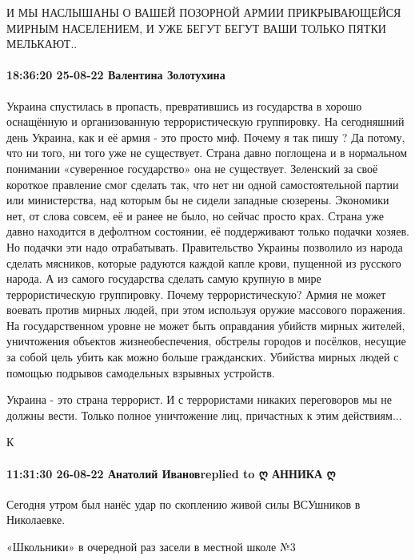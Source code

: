 И МЫ НАСЛЫШАНЫ О ВАШЕЙ ПОЗОРНОЙ АРМИИ ПРИКРЫВАЮЩЕЙСЯ МИРНЫМ НАСЕЛЕНИЕМ, И УЖЕ
БЕГУТ БЕГУТ ВАШИ ТОЛЬКО ПЯТКИ МЕЛЬКАЮТ..


\paragraph{18:36:20 25-08-22 Валентина Золотухина}

Украина спустилась в пропасть, превратившись из государства в хорошо оснащённую
и организованную террористическую группировку. На сегодняшний день Украина, как
и её армия - это просто миф. Почему я так пишу ? Да потому, что ни того, ни
того уже не существует. Страна давно поглощена и в нормальном понимании
«суверенное государство» она не существует. Зеленский за своё короткое
правление смог сделать так, что нет ни одной самостоятельной партии или
министерства, над которым бы не сидели западные сюзерены. Экономики нет, от
слова совсем, её и ранее не было, но сейчас просто крах. Страна уже давно
находится в дефолтном состоянии, её поддерживают только подачки хозяев. Но
подачки эти надо отрабатывать. Правительство Украины позволило из народа
сделать мясников, которые радуются каждой капле крови, пущенной из русского
народа. А из самого государства сделать самую крупную в мире террористическую
группировку. Почему террористическую? Армия не может воевать против мирных
людей, при этом используя оружие массового поражения. На государственном уровне
не может быть оправдания убийств мирных жителей, уничтожения объектов
жизнеобеспечения, обстрелы городов и посёлков, несущие за собой цель убить как
можно больше гражданских. Убийства мирных людей с помощью подрывов самодельных
взрывных устройств.

Украина - это страна террорист. И с террористами никаких переговоров мы не
должны вести. Только полное уничтожение лиц, причастных к этим действиям...

К 

\paragraph{11:31:30 26-08-22 Анатолий Ивановreplied to ღ АННИКА ღ}

Сегодня утром был нанёс удар по скоплению живой силы ВСУшников в Николаевке.

«Школьники» в очередной раз засели в местной школе №3

